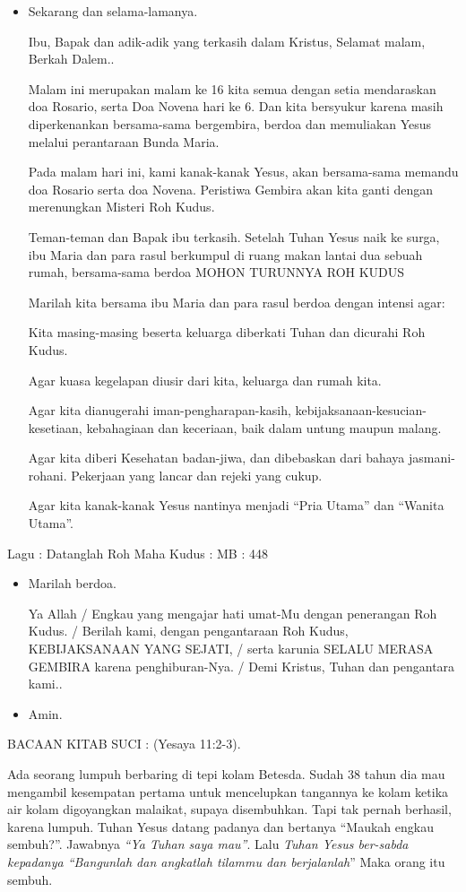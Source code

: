\documentclass[12pt]{article}
\def\rosario{16}
\def\novena{6}
\newcommand{\BU}[1]{\begin{itemize} \item[U:] #1 \end{itemize}}
\newcommand{\BP}[1]{\begin{itemize} \item[P:] #1 \end{itemize}}
\begin{document}
\BU{Sekarang dan selama-lamanya.

Ibu, Bapak dan adik-adik yang terkasih dalam Kristus, Selamat malam,
Berkah Dalem..

Malam ini merupakan malam ke \rosario{} kita semua dengan setia mendaraskan doa
Rosario, serta Doa Novena hari ke \novena{}. Dan kita bersyukur karena masih
diperkenankan bersama-sama bergembira, berdoa dan memuliakan Yesus
melalui perantaraan Bunda Maria. 

Pada malam hari ini, kami kanak-kanak Yesus, akan bersama-sama memandu
doa Rosario serta doa Novena. Peristiwa Gembira akan kita ganti dengan
merenungkan Misteri Roh Kudus.  

Teman-teman dan Bapak ibu terkasih. Setelah Tuhan Yesus naik ke surga,
ibu Maria dan para rasul berkumpul di ruang makan lantai dua sebuah
rumah, bersama-sama berdoa MOHON TURUNNYA ROH KUDUS 

Marilah kita bersama ibu Maria dan para rasul berdoa dengan intensi
agar: 

Kita masing-masing beserta keluarga diberkati Tuhan dan dicurahi Roh
Kudus. 

Agar kuasa kegelapan diusir dari kita, keluarga dan rumah kita. 

Agar kita dianugerahi iman-pengharapan-kasih,
kebijaksanaan-kesucian-kesetiaan, kebahagiaan dan keceriaan, baik dalam
untung maupun malang. 

Agar kita diberi Kesehatan badan-jiwa, dan dibebaskan dari bahaya
jasmani-rohani. Pekerjaan yang lancar dan rejeki yang cukup. 

Agar kita kanak-kanak Yesus nantinya menjadi {\textquotedblleft}Pria
Utama{\textquotedblright} dan {\textquotedblleft}Wanita
Utama{\textquotedblright}.} 

Lagu : Datanglah Roh Maha Kudus : MB : 448

\BP{Marilah berdoa. 

Ya Allah / Engkau yang mengajar hati umat-Mu dengan penerangan Roh
Kudus. / Berilah kami, dengan pengantaraan Roh Kudus, KEBIJAKSANAAN
YANG SEJATI, / serta karunia SELALU MERASA GEMBIRA karena
penghiburan-Nya. / Demi Kristus, Tuhan dan pengantara kami..} 

\BU{Amin.}

BACAAN KITAB SUCI : (Yesaya 11:2{}-3).

Ada seorang lumpuh berbaring di tepi kolam Betesda. Sudah 38 tahun dia
mau mengambil kesempatan pertama untuk mencelupkan tangannya ke kolam
ketika air kolam digoyangkan malaikat, supaya disembuhkan. Tapi tak
pernah berhasil, karena lumpuh. Tuhan Yesus datang padanya dan bertanya
{\textquotedblleft}Maukah engkau sembuh?{\textquotedblright}. Jawabnya
\emph{{\textquotedblleft}Ya Tuhan saya mau{\textquotedblright}}. Lalu
\emph{Tuhan Yesus ber-sabda kepadanya {\textquotedblleft}Bangunlah dan
angkatlah tilammu dan berjalanlah}{\textquotedblright} Maka orang itu
sembuh.
\end{document}
